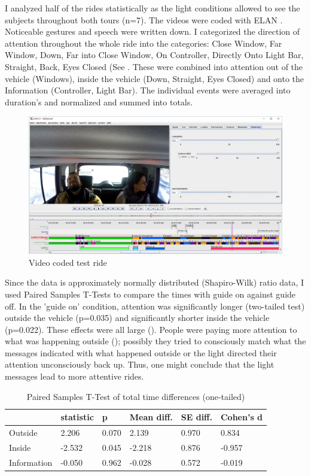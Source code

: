 I analyzed half of the rides statistically as the light conditions allowed to see the subjects throughout both tours (n=7). The videos were coded with ELAN \citep{Wittenburg2006ELAN:Research}. Noticeable gestures and speech were written down. I categorized the direction of attention throughout the whole ride into the categories: Close Window, Far Window, Down, Far into Close Window, On Controller, Directly Onto Light Bar, Straight, Back, Eyes Closed (See \emph{}. These were combined into attention out of the vehicle (Windows), inside the vehicle (Down, Straight, Eyes Closed) and onto the Information (Controller, Light Bar). The individual events were averaged into duration's and normalized and summed into totals.
\begin{figure}
    \includegraphics[width=1\textwidth]{fig/StefSas.JPG}
    \caption[Video Coding]{Video coded test ride}
    \label{fig:videocode}
\end{figure}
Since the data is approximately normally distributed (Shapiro-Wilk) ratio data, I used Paired Samples T-Tests to compare the times with guide on against guide off. In the 'guide on' condition, attention was significantly longer (two-tailed test) outside the vehicle (p=0.035) and significantly shorter inside the vehicle (p=0.022). These effects were all large (\emph{}). People were paying more attention to what was happening outside (\emph{}); possibly they tried to consciously match what the messages indicated with what happened outside or the light directed their attention unconsciously back up. Thus, one might conclude that the light messages lead to more attentive rides. 

\begin{table}
\label{tab:totalVideo}
  \caption{Paired Samples T-Test of total time differences (one-tailed)}
\begin{tabular}{@{}llllll@{}}
\toprule
 & statistic &  p & Mean diff. & SE diff. & Cohen's d \\ \midrule
Outside & 2.206 &  0.070 & 2.139 & 0.970 & 0.834 \\
Inside & -2.532 &  0.045 & -2.218 & 0.876 & -0.957 \\
Information & -0.050 &  0.962 & -0.028 & 0.572 & -0.019 \\ \bottomrule
\end{tabular}
\end{table}

